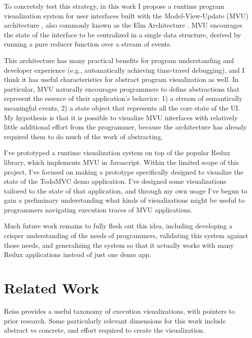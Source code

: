 \documentclass{sigchi}
\begin{document}
To concretely test this strategy, in this work I propose a runtime
program visualization system for user interfaces built with the
Model-View-Update (MVU) architecture \autocite{fowler2020}, also
commonly known as the Elm Architecture \autocite{czaplicki}. MVU
encourages the state of the interface to be centralized in a single data
structure, derived by running a pure reducer function over a stream of
events.

This architecture has many practical benefits for program understanding
and developer experience (e.g., automatically achieving time-travel
debugging), and I think it has useful characteristics for abstract
program visualization as well. In particular, MVU naturally encourages
programmers to define abstractions that represent the essence of their
application's behavior: 1) a stream of semantically meaningful events,
2) a state object that represents all the core state of the UI. My
hypothesis is that it is possible to visualize MVU interfaces with
relatively little additional effort from the programmer, because the
architecture has already required them to do much of the work of
abstracting.

I've prototyped a runtime visualization system on top of the popular
Redux \autocite{zotero-621} library, which implements MVU in Javascript.
Within the limited scope of this project, I've focused on making a
prototype specifically designed to visualize the state of the TodoMVC
demo application. I've designed some visualizations tailored to the
state of that application, and through my own usage I've begun to gain a
preliminary understanding what kinds of visualizations might be useful
to programmers navigating execution traces of MVU applications.

Much future work remains to fully flesh out this idea, including
developing a crisper understanding of the needs of programmers,
validating this system against those needs, and generalizing the system
so that it actually works with many Redux applications instead of just
one demo app.

\hypertarget{sec:related-work}{%
\section{Related Work}\label{sec:related-work}}

Reiss \autocite{reiss2007} provides a useful taxonomy of execution
visualizations, with pointers to prior research. Some particularly
relevant dimensions for this work include abstract vs concrete, and
effort required to create the visualization.
\end{document}
